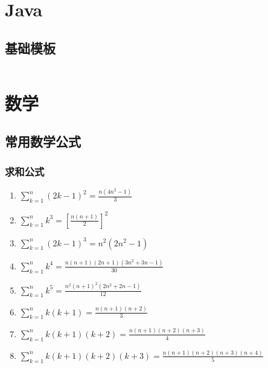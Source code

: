 \documentclass[a4paper]{article}
\newcommand{\javacode}[1]{
    \inputminted[mathescape]{java}{source/#1}
}
\begin{document}
\section{Java}

\subsection{基础模板}

\javacode{template.java}



\section{数学}


\subsection{常用数学公式}

\subsubsection{求和公式}

\begin{enumerate}
	\item $\sum_{k=1}^{n}(2k-1)^2 = \frac{n(4n^2-1)}{3}	$
	\item $\sum_{k=1}^{n}k^3 = [\frac{n(n+1)}{2}]^2	$
	\item $\sum_{k=1}^{n}(2k-1)^3 = n^2(2n^2-1)	$
	\item $\sum_{k=1}^{n}k^4 = \frac{n(n+1)(2n+1)(3n^2+3n-1)}{30}  $
	\item $\sum_{k=1}^{n}k^5 = \frac{n^2(n+1)^2(2n^2+2n-1)}{12}	$
	\item $\sum_{k=1}^{n}k(k+1) = \frac{n(n+1)(n+2)}{3}	$
	\item $\sum_{k=1}^{n}k(k+1)(k+2) = \frac{n(n+1)(n+2)(n+3)}{4} $
	\item $\sum_{k=1}^{n}k(k+1)(k+2)(k+3) = \frac{n(n+1)(n+2)(n+3)(n+4)}{5} $
\end{enumerate}
\end{document}
